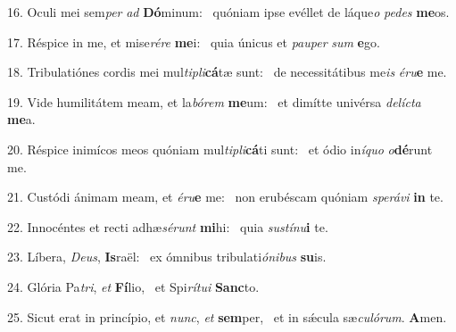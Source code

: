 16. Oculi mei sem\textit{per} \textit{ad} \textbf{Dó}minum: \ast\  quóniam ipse evéllet de láque\textit{o} \textit{pe}\textit{des} \textbf{me}os.\

17. Réspice in me, et mise\textit{ré}\textit{re} \textbf{me}i: \ast\  quia únicus et \textit{pau}\textit{per} \textit{sum} \textbf{e}go.\

18. Tribulatiónes cordis mei mul\textit{ti}\textit{pli}\textbf{cá}tæ sunt: \ast\  de necessitátibus me\textit{is} \textit{é}\textit{ru}\textbf{e} me.\

19. Vide humilitátem meam, et la\textit{bó}\textit{rem} \textbf{me}um: \ast\  et dimítte univérsa \textit{de}\textit{líc}\textit{ta} \textbf{me}a.\

20. Réspice inimícos meos quóniam mul\textit{ti}\textit{pli}\textbf{cá}ti sunt: \ast\  et ódio in\textit{í}\textit{quo} \textit{o}\textbf{dé}runt me.\

21. Custódi ánimam meam, et \textit{é}\textit{ru}\textbf{e} me: \ast\  non erubéscam quóniam \textit{spe}\textit{rá}\textit{vi} \textbf{in} te.\

22. Innocéntes et recti adhæ\textit{sé}\textit{runt} \textbf{mi}hi: \ast\  quia \textit{sus}\textit{tí}\textit{nu}\textbf{i} te.\

23. Líbera, \textit{De}\textit{us}, \textbf{Is}raël: \ast\  ex ómnibus tribulati\textit{ó}\textit{ni}\textit{bus} \textbf{su}is.\

24. Glória Pa\textit{tri}, \textit{et} \textbf{Fí}lio, \ast\  et Spi\textit{rí}\textit{tu}\textit{i} \textbf{Sanc}to.\

25. Sicut erat in princípio, et \textit{nunc}, \textit{et} \textbf{sem}per, \ast\  et in sǽcula sæ\textit{cu}\textit{ló}\textit{rum}. \textbf{A}men.\


